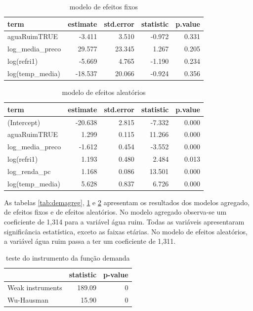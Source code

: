 \documentclass[
  12pt,
]{book}
\begin{document}
\begin{table}

\caption{\label{tab:demfe}modelo de efeitos fixos}
\centering
\begin{tabular}[t]{l|r|r|r|r}
\hline
term & estimate & std.error & statistic & p.value\\
\hline
aguaRuimTRUE & -3.411 & 3.510 & -0.972 & 0.331\\
\hline
log\_media\_preco & 29.577 & 23.345 & 1.267 & 0.205\\
\hline
log(refri1) & -5.669 & 4.765 & -1.190 & 0.234\\
\hline
log(temp\_media) & -18.537 & 20.066 & -0.924 & 0.356\\
\hline
\end{tabular}
\end{table}

\begin{table}

\caption{\label{tab:demre}modelo de efeitos aleatórios}
\centering
\begin{tabular}[t]{l|r|r|r|r}
\hline
term & estimate & std.error & statistic & p.value\\
\hline
(Intercept) & -20.638 & 2.815 & -7.332 & 0.000\\
\hline
aguaRuimTRUE & 1.299 & 0.115 & 11.266 & 0.000\\
\hline
log\_media\_preco & -1.612 & 0.454 & -3.552 & 0.000\\
\hline
log(refri1) & 1.193 & 0.480 & 2.484 & 0.013\\
\hline
log\_renda\_pc & 1.168 & 0.086 & 13.501 & 0.000\\
\hline
log(temp\_media) & 5.628 & 0.837 & 6.726 & 0.000\\
\hline
\end{tabular}
\end{table}

As tabelas \ref{tab:demagreg}, \ref{tab:demfe} e \ref{tab:demre} apresentam os resultados dos modelos agregado, de efeitos fixos e de efeitos aleatórios. No modelo agregado observa-se um coeficiente de 1,314 para a variável água ruim. Todas as variáveis apresentaram significância estatística, exceto as faixas etárias. No modelo de efeitos aleatórios, a variável água ruim passa a ter um coeficiente de 1,311.

\begin{table}

\caption{\label{tab:testinstrument}teste do instrumento da função demanda}
\centering
\begin{tabular}[t]{l|r|r}
\hline
  & statistic & p-value\\
\hline
Weak instruments & 189.09 & 0\\
\hline
Wu-Hausman & 15.90 & 0\\
\hline
\end{tabular}
\end{table}
\end{document}
